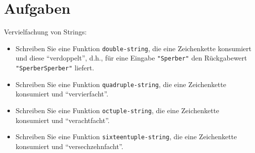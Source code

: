 \section*{Aufgaben}



\begin{aufgabe}
 Vervielfachung von Strings:
 \begin{itemize}
  \item Schreiben Sie eine Funktion \texttt{double-string}, die eine Zeichenkette konsumiert und
    diese "`verdoppelt"', d.h., für eine Eingabe \verb|"Sperber"| den
    Rückgabewert \verb|"SperberSperber"| liefert.
    
  \item Schreiben Sie eine Funktion \texttt{quadruple-string}, die eine
    Zeichenkette konsumiert und "`vervierfacht"'.

  \item Schreiben Sie eine Funktion \texttt{octuple-string}, die eine
    Zeichenkette konsumiert und "`verachtfacht"'.

  \item Schreiben Sie eine Funktion \texttt{sixteentuple-string}, die
    eine Zeichenkette konsumiert und "`versechzehnfacht"'.
  \end{itemize}


\end{aufgabe}

